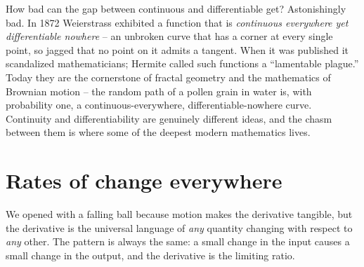\begin{aestheticbox}
How bad can the gap between continuous and differentiable get? Astonishingly bad.
In 1872 Weierstrass exhibited a function that is \emph{continuous everywhere yet
differentiable nowhere} -- an unbroken curve that has a corner at every single
point, so jagged that no point on it admits a tangent. When it was published it
scandalized mathematicians; Hermite called such functions a ``lamentable plague.''
Today they are the cornerstone of fractal geometry and the mathematics of
Brownian motion -- the random path of a pollen grain in water is, with probability
one, a continuous-everywhere, differentiable-nowhere curve. Continuity and
differentiability are genuinely different ideas, and the chasm between them is
where some of the deepest modern mathematics lives.
\end{aestheticbox}

\section{Rates of change everywhere}
\label{ch10:rates-everywhere}

We opened with a falling ball because motion makes the derivative tangible, but
the derivative is the universal language of \emph{any} quantity changing with
respect to \emph{any} other. The pattern is always the same: a small change in the
input causes a small change in the output, and the derivative is the limiting
ratio.

